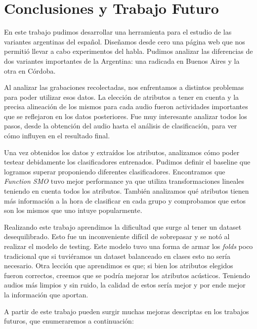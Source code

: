 \chapter{Conclusiones y Trabajo Futuro}

En este trabajo pudimos desarrollar una herramienta para el estudio de las variantes argentinas del español. Diseñamos desde cero una página web que nos permitió llevar a cabo experimentos del habla. Pudimos analizar las diferencias de dos variantes importantes de la Argentina: una radicada en Buenos Aires y la otra en Córdoba. 

Al analizar las grabaciones recolectadas, nos enfrentamos a distintos problemas para poder utilizar esos datos. La elección de atributos a tener en cuenta y la precisa alineación de los mismos para cada audio fueron actividades importantes que se reflejaron en los datos posteriores. Fue muy interesante analizar todos los pasos, desde la obtención del audio hasta el análisis de clasificación, para ver cómo influyen en el resultado final.

Una vez obtenidos los datos y extraídos los atributos, analizamos cómo poder testear debidamente los clasificadores entrenados. Pudimos definir el baseline que logramos superar proponiendo diferentes clasificadores. Encontramos que \textit{Function SMO} tuvo mejor performance ya que utiliza transformaciones lineales teniendo en cuenta todos los atributos. También analizamos qué atributos tienen más información a la hora de clasificar en cada grupo y comprobamos que estos son los mismos que uno intuye popularmente.

Realizando este trabajo aprendimos la dificultad que surge al tener un dataset desequilibrado. Esto fue un inconveniente difícil de sobrepasar y se notó al realizar el modelo de testing. Este modelo tuvo una forma de armar los \textit{folds} poco tradicional que si tuviéramos un dataset balanceado en clases esto no sería necesario. Otra lección que aprendimos es que; si bien los atributos elegidos fueron correctos, creemos que se podría mejorar los atributos acústicos. Teniendo audios más limpios y sin ruido, la calidad de estos sería mejor y por ende mejor la información que aportan. 

A partir de este trabajo pueden surgir muchas mejoras descriptas en los trabajos futuros, que enumeraremos a continuación:

